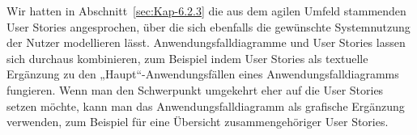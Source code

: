 \vspace{\baselineskip} %

Wir hatten in Abschnitt~\ref{sec:Kap-6.2.3} die aus dem agilen Umfeld stammenden User \mbox{Stories} angesprochen, über die sich ebenfalls die gewünschte Systemnutzung der Nutzer modellieren lässt. Anwendungsfalldiagramme und User Stories lassen sich durchaus kombinieren, zum Beispiel indem User Stories als textuelle Ergänzung zu den „Haupt“-Anwendungsfällen eines Anwendungsfalldiagramms fungieren. Wenn man den Schwerpunkt umgekehrt eher auf die User Stories setzen möchte, kann man das Anwendungsfalldiagramm als grafische Ergänzung verwenden, zum Beispiel für eine Übersicht zusammengehöriger User Stories.

\vspace{\baselineskip} %